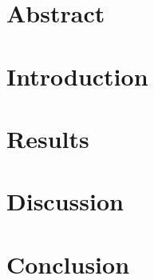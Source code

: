 \documentclass[type=report,foot=true,colorhead=true]{rwuthesis} %
\title{\batitle}
\author{Jose Luiz S. Mendonça}
\date{\today}
\begin{document}
\maketitle

\newpage
\tableofcontents
\newpage

\chapter{Abstract}
\chapter{Introduction}
\chapter{Results}
\chapter{Discussion}
\chapter{Conclusion}

%


\end{document}
